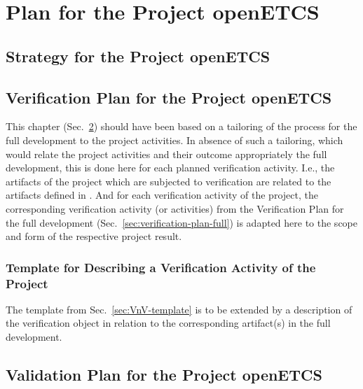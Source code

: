 \documentclass{template/openetcs_report}
\begin{document}
%



\part{\VV Plan for the Project openETCS}

\chapter{\VV Strategy for the Project openETCS}
\label{sec:vv-strategy-project}

%


\chapter{Verification Plan for the Project openETCS}
 \label{sec:verification-plan-project}

% 

 This chapter (Sec.~\ref{sec:verification-plan-project}) should have
 been based on a tailoring of the process for the full development
 \cite{openETCS:D2.3a-V02} to the project activities. In absence of
 such a tailoring, which would relate the project activities and their
 outcome appropriately the full development, this is done here for
 each planned verification activity. I.e., the artifacts of the
 project which are subjected to verification are related to the
 artifacts defined in \cite{openETCS:D2.3a-V02}. And for each
 verification activity of the project, the corresponding verification
 activity (or activities) from the Verification Plan for the full
 development (Sec.~\ref{sec:verification-plan-full}) is adapted here
 to the scope and form of the respective project result.

\setcounter{section}{-1}
\section{Template for Describing a Verification Activity of the Project}
\label{sec:VnV-template-project}

The template from Sec.~\ref{sec:VnV-template} is to be extended by a
description of the verification object in relation to the
corresponding artifact(s) in the full development. 



\chapter{Validation Plan for the Project openETCS}
 \label{sec:validation-plan-project}
\end{document}
